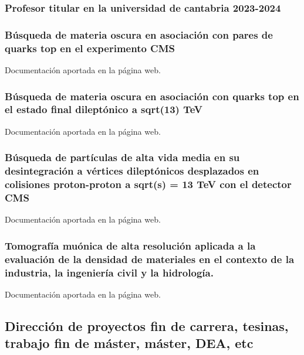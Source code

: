 \documentclass[a4paper, 11pt, twoside, openright]{report}
\begin{document}
\subsubsection{Profesor titular en la universidad de cantabria 2023-2024}
%


\subsubsection{Búsqueda de materia oscura en asociación con pares de quarks top en el experimento CMS}
%
Documentación aportada en la página web.
\subsubsection{Búsqueda de materia oscura en asociación con quarks top en el estado final dileptónico a sqrt(13) TeV}
%
Documentación aportada en la página web.
\subsubsection{Búsqueda de partículas de alta vida media en su desintegración a vértices dileptónicos desplazados en colisiones proton-proton a sqrt(s) = 13 TeV con el detector CMS}
%
Documentación aportada en la página web.
\subsubsection{Tomografía muónica de alta resolución aplicada a la evaluación de la densidad de materiales en el contexto de la industria, la ingeniería civil y la hidrología.}
%
Documentación aportada en la página web.




\subsection{Dirección de proyectos fin de carrera, tesinas, trabajo fin de máster, máster, DEA, etc}
\end{document}

